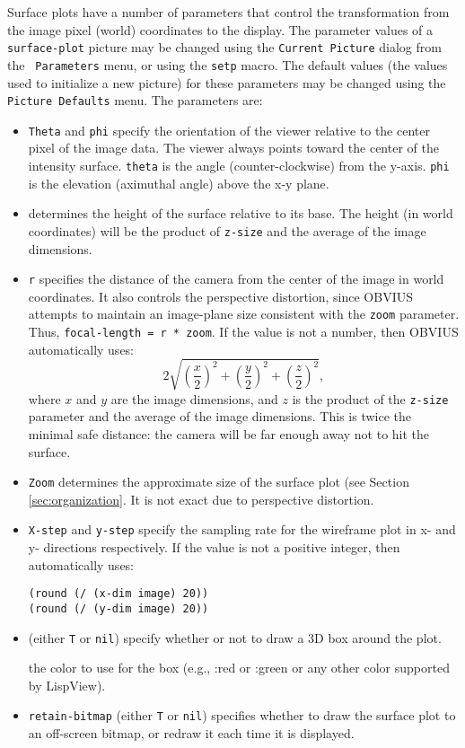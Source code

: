 Surface plots have a number of parameters that control the
transformation from the image pixel (world) coordinates to the
display.  The parameter values of a {\tt surface-plot} picture may be
changed using the {\tt Current Picture} dialog from the {\tt
Parameters} menu, or using the {\tt setp} macro.  The default values
(the values used to initialize a new picture) for these parameters may
be changed using the {\tt Picture Defaults} menu.  The parameters are:
\begin{itemize}

\item {\tt Theta} and {\tt phi} specify the orientation of the viewer
relative to the center pixel of the image data.  The viewer always
points toward the center of the intensity surface.  {\tt theta} is the
angle (counter-clockwise) from the y-axis.  {\tt phi} is the elevation
(aximuthal angle) above the x-y plane.

\item {} determines the height of the surface relative to
its base.  The height (in world coordinates) will be the product of
{\tt z-size} and the average of the image dimensions.

\item {\tt r} specifies the distance of the camera from the center of
the image in world coordinates.  It also controls the perspective
distortion, since OBVIUS attempts to maintain an image-plane size
consistent with the {\tt zoom} parameter.  Thus, {\tt focal-length = r
* zoom}.  If the value is not a number, then OBVIUS automatically
uses:
\[
2\sqrt{\left(\frac{x}{2}\right)^2 + \left(\frac{y}{2}\right)^2 + 
		\left(\frac{z}{2}\right)^2},
\]
where $x$ and $y$ are the image dimensions, and $z$ is the product of
the {\tt z-size} parameter and the average of the image dimensions.
This is twice the minimal safe distance: the camera will be far enough
away not to hit the surface.

\item {\tt Zoom} determines the approximate size of the surface plot (see Section
\ref{sec:organization}.  It is not exact due to perspective distortion.

\item {\tt X-step} and {\tt y-step} specify the sampling rate for the
wireframe plot in x- and y- directions respectively.  If the value is
not a positive integer, then automatically uses:
\begin{verbatim}
(round (/ (x-dim image) 20))
(round (/ (y-dim image) 20))
\end{verbatim}

\item {} (either {\tt T} or {\tt nil}) specify whether or
not to draw a 3D box around the plot.

 the color to use for the box (e.g., :red or :green or
any other color supported by LispView).

\item {\tt retain-bitmap} (either {\tt T} or {\tt nil}) specifies
whether to draw the surface plot to an off-screen bitmap, or redraw it
each time it is displayed.
\end{itemize}

